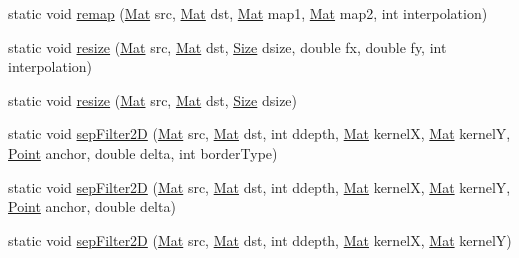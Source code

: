 \begin{DoxyCompactItemize}
\item 
static void \mbox{\hyperlink{classorg_1_1opencv_1_1imgproc_1_1_imgproc_a2abe0c60d2f4707962a472e94c0841e0}{remap}} (\mbox{\hyperlink{classorg_1_1opencv_1_1core_1_1_mat}{Mat}} src, \mbox{\hyperlink{classorg_1_1opencv_1_1core_1_1_mat}{Mat}} dst, \mbox{\hyperlink{classorg_1_1opencv_1_1core_1_1_mat}{Mat}} map1, \mbox{\hyperlink{classorg_1_1opencv_1_1core_1_1_mat}{Mat}} map2, int interpolation)
\item 
static void \mbox{\hyperlink{classorg_1_1opencv_1_1imgproc_1_1_imgproc_ae781b575f9f20dbefb20eb2bb9966ae2}{resize}} (\mbox{\hyperlink{classorg_1_1opencv_1_1core_1_1_mat}{Mat}} src, \mbox{\hyperlink{classorg_1_1opencv_1_1core_1_1_mat}{Mat}} dst, \mbox{\hyperlink{classorg_1_1opencv_1_1core_1_1_size}{Size}} dsize, double fx, double fy, int interpolation)
\item 
static void \mbox{\hyperlink{classorg_1_1opencv_1_1imgproc_1_1_imgproc_ae2819900a62b48a2d701f0c5ead64922}{resize}} (\mbox{\hyperlink{classorg_1_1opencv_1_1core_1_1_mat}{Mat}} src, \mbox{\hyperlink{classorg_1_1opencv_1_1core_1_1_mat}{Mat}} dst, \mbox{\hyperlink{classorg_1_1opencv_1_1core_1_1_size}{Size}} dsize)
\item 
static void \mbox{\hyperlink{classorg_1_1opencv_1_1imgproc_1_1_imgproc_a7c78cbc2fc093f0008a749cfa15c3a81}{sep\+Filter2D}} (\mbox{\hyperlink{classorg_1_1opencv_1_1core_1_1_mat}{Mat}} src, \mbox{\hyperlink{classorg_1_1opencv_1_1core_1_1_mat}{Mat}} dst, int ddepth, \mbox{\hyperlink{classorg_1_1opencv_1_1core_1_1_mat}{Mat}} kernelX, \mbox{\hyperlink{classorg_1_1opencv_1_1core_1_1_mat}{Mat}} kernelY, \mbox{\hyperlink{classorg_1_1opencv_1_1core_1_1_point}{Point}} anchor, double delta, int border\+Type)
\item 
static void \mbox{\hyperlink{classorg_1_1opencv_1_1imgproc_1_1_imgproc_abea9b14d3e482c71996b0af7ad20b384}{sep\+Filter2D}} (\mbox{\hyperlink{classorg_1_1opencv_1_1core_1_1_mat}{Mat}} src, \mbox{\hyperlink{classorg_1_1opencv_1_1core_1_1_mat}{Mat}} dst, int ddepth, \mbox{\hyperlink{classorg_1_1opencv_1_1core_1_1_mat}{Mat}} kernelX, \mbox{\hyperlink{classorg_1_1opencv_1_1core_1_1_mat}{Mat}} kernelY, \mbox{\hyperlink{classorg_1_1opencv_1_1core_1_1_point}{Point}} anchor, double delta)
\item 
static void \mbox{\hyperlink{classorg_1_1opencv_1_1imgproc_1_1_imgproc_ad20d4e66d9913829813d3a22f96d8c6e}{sep\+Filter2D}} (\mbox{\hyperlink{classorg_1_1opencv_1_1core_1_1_mat}{Mat}} src, \mbox{\hyperlink{classorg_1_1opencv_1_1core_1_1_mat}{Mat}} dst, int ddepth, \mbox{\hyperlink{classorg_1_1opencv_1_1core_1_1_mat}{Mat}} kernelX, \mbox{\hyperlink{classorg_1_1opencv_1_1core_1_1_mat}{Mat}} kernelY)

\end{DoxyCompactItemize}
